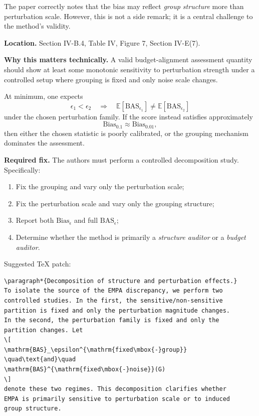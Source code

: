 The paper correctly notes that the bias may reflect \emph{group structure} more than perturbation scale. However, this is not a side remark; it is a central challenge to the method's validity.

\textbf{Location.}  
Section IV-B.4, Table IV, Figure 7, Section IV-E(7).

\textbf{Why this matters technically.}  
A valid budget-alignment assessment quantity should show at least some monotonic sensitivity to perturbation strength under a controlled setup where grouping is fixed and only noise scale changes.

At minimum, one expects
\[
\epsilon_1 < \epsilon_2
\quad \Longrightarrow \quad
\mathbb{E}[\mathrm{BAS}_{\epsilon_1}]
\neq
\mathbb{E}[\mathrm{BAS}_{\epsilon_2}]
\]
under the chosen perturbation family. If the score instead satisfies approximately
\[
\mathrm{Bias}_{0.1} \approx \mathrm{Bias}_{0.01},
\]
then either the chosen statistic is poorly calibrated, or the grouping mechanism dominates the assessment.

\textbf{Required fix.}  
The authors must perform a controlled decomposition study. Specifically:

\begin{enumerate}
\item Fix the grouping and vary only the perturbation scale;
\item Fix the perturbation scale and vary only the grouping structure;
\item Report both $\mathrm{Bias}_\epsilon$ and full $\mathrm{BAS}_\epsilon$;
\item Determine whether the method is primarily a \emph{structure auditor} or a \emph{budget auditor}.
\end{enumerate}

Suggested TeX patch:

\begin{verbatim}
\paragraph*{Decomposition of structure and perturbation effects.}
To isolate the source of the EMPA discrepancy, we perform two
controlled studies. In the first, the sensitive/non-sensitive
partition is fixed and only the perturbation magnitude changes.
In the second, the perturbation family is fixed and only the
partition changes. Let
\[
\mathrm{BAS}_\epsilon^{\mathrm{fixed\mbox{-}group}}
\quad\text{and}\quad
\mathrm{BAS}^{\mathrm{fixed\mbox{-}noise}}(G)
\]
denote these two regimes. This decomposition clarifies whether
EMPA is primarily sensitive to perturbation scale or to induced
group structure.
\end{verbatim}

